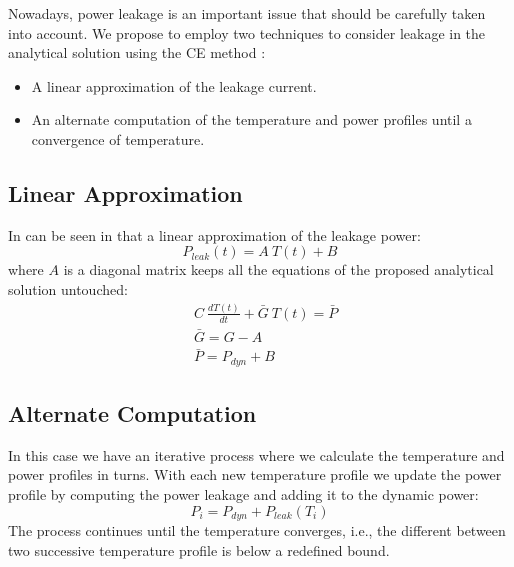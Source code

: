   Nowadays, power leakage is an important issue that should be carefully taken into account. We propose to employ two techniques to consider leakage in the analytical solution using the CE method \cite{liu2007}:
  \begin{itemize}
    \item A linear approximation of the leakage current.
    \item An alternate computation of the temperature and power profiles until a convergence of temperature.
  \end{itemize}

\subsection{Linear Approximation}
In can be seen in  that a linear approximation of the leakage power:
\[
  P_{leak}(t) = A \: T(t) + B
\]
where $A$ is a diagonal matrix keeps all the equations of the proposed analytical solution untouched:
\begin{align*}
  & C \: \frac{dT(t)}{dt} + \bar{G} \: T(t) = \bar{P} \\
  & \bar{G} = G - A \\
  & \bar{P} = P_{dyn} + B
\end{align*}

\subsection{Alternate Computation}
In this case we have an iterative process where we calculate the temperature and power profiles in turns. With each new temperature profile we update the power profile by computing the power leakage and adding it to the dynamic power:
\[
  P_i = P_{dyn} + P_{leak}(T_i)
\]
The process continues until the temperature converges, i.e., the different between two successive temperature profile is below a redefined bound.
